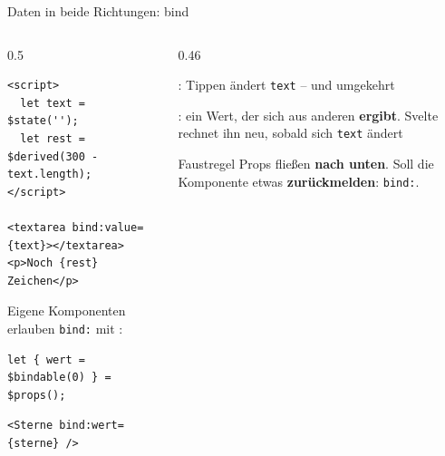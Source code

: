 \begin{frame}[fragile]{Daten in beide Richtungen: bind}
  \begin{columns}[onlytextwidth,t]
    \begin{column}{0.5\textwidth}
\begin{lstlisting}[style=svelte]
<script>
  let text = $state('');
  let rest = $derived(300 - text.length);
</script>

<textarea bind:value={text}></textarea>
<p>Noch {rest} Zeichen</p>
\end{lstlisting}
      \footnotesize Eigene Komponenten erlauben \texttt{bind:} mit :
\begin{lstlisting}[style=svelte,numbers=none]
let { wert = $bindable(0) } = $props();
\end{lstlisting}
\begin{lstlisting}[style=svelte,numbers=none]
<Sterne bind:wert={sterne} />
\end{lstlisting}
    \end{column}
    \begin{column}{0.46\textwidth}
      \footnotesize
      \begin{tugitemize}
        \item[6] \textbf{}: Tippen ändert \texttt{text} --
              und umgekehrt
        \item[3] : ein Wert, der sich aus anderen \textbf{ergibt}.
              Svelte rechnet ihn neu, sobald sich \texttt{text} ändert
      \end{tugitemize}
      \begin{block}{Faustregel}
        \footnotesize Props fließen \textbf{nach unten}. Soll die Komponente etwas
        \textbf{zurückmelden}: \texttt{bind:}.
      \end{block}
    \end{column}
  \end{columns}
\end{frame}

